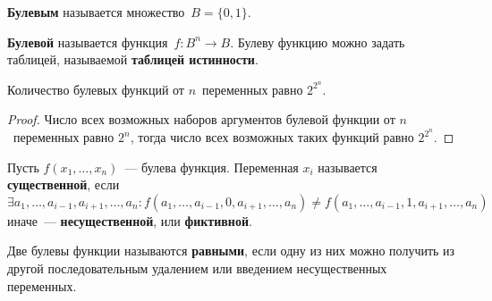  \textbf{Булевым} называется множество~$B = \{ 0, 1 \}$.

 \textbf{Булевой} называется функция~$f \colon B^n \to B$.
Булеву функцию можно задать таблицей, называемой \textbf{таблицей истинности}.

\begin{statement}
Количество булевых функций от $n$~переменных равно $2^{2^n}$.
\end{statement}
\begin{proof}
Число всех возможных наборов аргументов булевой функции от $n$~переменных равно $2^n$, тогда число всех возможных таких функций равно $2^{2^n}$.
\end{proof}

Пусть $f(x_1, \ldots, x_n)$~--- булева функция.
  Переменная $x_i$ называется \textbf{существенной}, если
\begin{equation*}
\exists a_1, \ldots, a_{i-1}, a_{i+1}, \ldots, a_n \colon
f(a_1, \ldots, a_{i-1}, 0, a_{i+1}, \ldots, a_n) \neq f(a_1, \ldots, a_{i-1}, 1, a_{i+1}, \ldots, a_n)
\end{equation*}
иначе~--- \textbf{несущественной}, или \textbf{фиктивной}.

Две булевы функции называются \textbf{равными}, если одну из них можно получить из другой последовательным удалением или введением несущественных переменных.